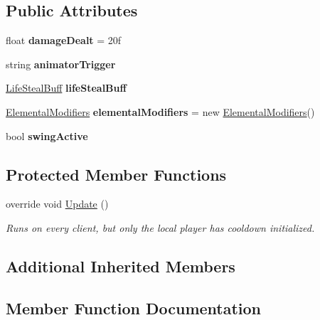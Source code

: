 \subsection*{Public Attributes}
\begin{DoxyCompactItemize}
\item 
\hypertarget{class_basic_slash_aba2550a9ded380921589154c431b2d5d}{}\label{class_basic_slash_aba2550a9ded380921589154c431b2d5d} 
float {\bfseries damage\+Dealt} = 20f
\item 
\hypertarget{class_basic_slash_aa2aaca16e21f9b1ae4e60351645daf5f}{}\label{class_basic_slash_aa2aaca16e21f9b1ae4e60351645daf5f} 
string {\bfseries animator\+Trigger}
\item 
\hypertarget{class_basic_slash_a64ce8278c7bccbca3114a7128817cfcb}{}\label{class_basic_slash_a64ce8278c7bccbca3114a7128817cfcb} 
\hyperlink{class_life_steal_buff}{Life\+Steal\+Buff} {\bfseries life\+Steal\+Buff}
\item 
\hypertarget{class_basic_slash_ab20e78df0bfb0c598270537bc1864502}{}\label{class_basic_slash_ab20e78df0bfb0c598270537bc1864502} 
\hyperlink{class_elemental_modifiers}{Elemental\+Modifiers} {\bfseries elemental\+Modifiers} = new \hyperlink{class_elemental_modifiers}{Elemental\+Modifiers}()
\item 
\hypertarget{class_basic_slash_a8bc792497affb3acf2cf59f34aa6afc3}{}\label{class_basic_slash_a8bc792497affb3acf2cf59f34aa6afc3} 
bool {\bfseries swing\+Active}
\end{DoxyCompactItemize}
\subsection*{Protected Member Functions}
\begin{DoxyCompactItemize}
\item 
override void \hyperlink{class_basic_slash_a9bea8e187ba9a52f3a6ab0b48a218f60}{Update} ()
\begin{DoxyCompactList}\small\item\em Runs on every client, but only the local player has cooldown initialized. \end{DoxyCompactList}\end{DoxyCompactItemize}
\subsection*{Additional Inherited Members}


\subsection{Member Function Documentation}
\hypertarget{class_basic_slash_a83d162978fe54d3c4fffc283d8efcde3}{}\label{class_basic_slash_a83d162978fe54d3c4fffc283d8efcde3} 
